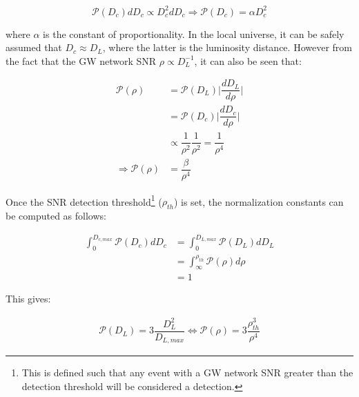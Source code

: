         \begin{equation}
            \mathcal{P}(D_c) dD_c \propto D_c^2 dD_c \Rightarrow
                \boxed{\mathcal{P}(D_c) = \alpha D_c^2}
        \end{equation}

        where $\alpha$ is the constant of proportionality. In the local universe, it can
        be safely assumed that $D_c \approx D_L$, where the latter is the luminosity
        distance.  However from the fact that the GW network SNR $\rho \propto
        D_L^{-1}$, it can also be seen that:

        \begin{align}
            \mathcal{P}(\rho) &= \mathcal{P}(D_L)
                                  \Big \lvert \dfrac{dD_L}{d\rho} \Big \rvert
                                  \nonumber\\
                              &= \mathcal{P}({D_c})
                                  \Big \lvert \dfrac{dD_c}{d\rho} \Big \rvert
                                  \nonumber\\
                              &\propto \dfrac{1}{\rho^2} \dfrac{1}{\rho^2}
                                  = \dfrac{1}{\rho^4} \nonumber\\
            \Rightarrow \mathcal{P} (\rho) &= \dfrac{\beta}{\rho^4}
        \end{align}

        Once the SNR detection threshold\footnote{
            This is defined such that any event with a GW network SNR greater than the
            detection threshold will be considered a detection.
        } ($\rho_{th}$) is set, the normalization constants can be computed as follows:

        \begin{align}
            \int_0^{D_{c, max}}
                \mathcal{P}(D_c) dD_c &= \int_0^{D_{L, max}} \mathcal{P}(D_L) dD_L \\
                                      &= \int_\infty^{\rho_{th}} \mathcal{P}(\rho)
                                          d\rho \\
                                      &= 1
        \end{align}

        This gives:

        \begin{align}
            \label{eq:lum_dist}
            \mathcal{P}(D_L) = 3 \dfrac{D_L^2}{D_{L, max}}
                                 \Leftrightarrow
            \mathcal{P}(\rho) = 3 \dfrac{\rho_{th}^3}{\rho^4}
        \end{align}

